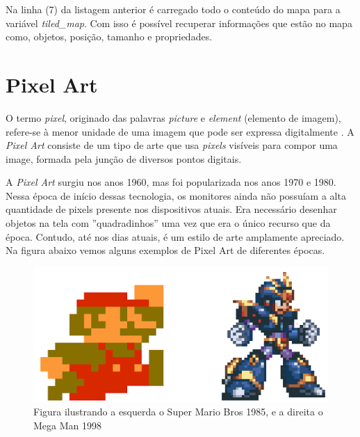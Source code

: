 \clearpage


Na linha (7) da listagem anterior é carregado todo o conteúdo do mapa para a variável \textit{tiled\_map}. Com isso é possível recuperar informações que estão no mapa como, objetos, posição, tamanho e propriedades. 


\section{Pixel Art}
\label{sec:pixel-art}
O termo \textit{pixel}, originado das palavras \textit{picture} e \textit{element} (elemento de imagem), refere-se à menor  unidade de uma imagem que pode ser expressa digitalmente \cite{lyon2006brief}. A \textit{Pixel Art} consiste de um tipo de arte que usa \textit{pixels} visíveis para compor uma image, formada pela junção de diversos pontos digitais.

A \textit{Pixel Art} surgiu nos anos 1960, mas foi popularizada nos anos 1970 e 1980. Nessa época de início dessas tecnologia, os monitores ainda não possuíam a alta quantidade de pixels presente nos dispositivos atuais. Era necessário desenhar objetos na tela com ''quadradinhos'' uma vez que era o único recurso que da época. Contudo, até nos dias atuais, é um estilo de arte amplamente apreciado. Na figura abaixo vemos alguns exemplos de Pixel Art de diferentes épocas.

\begin{figure}[h!]
    \centering
    \includegraphics[width=0.6\linewidth]{figuras/comparative-8bit-32-bit-pixel-art.png}
    \caption{Figura ilustrando a esquerda o Super Mario Bros 1985, e a direita o Mega Man 1998}
    \label{fig:enter-label}
\end{figure}

